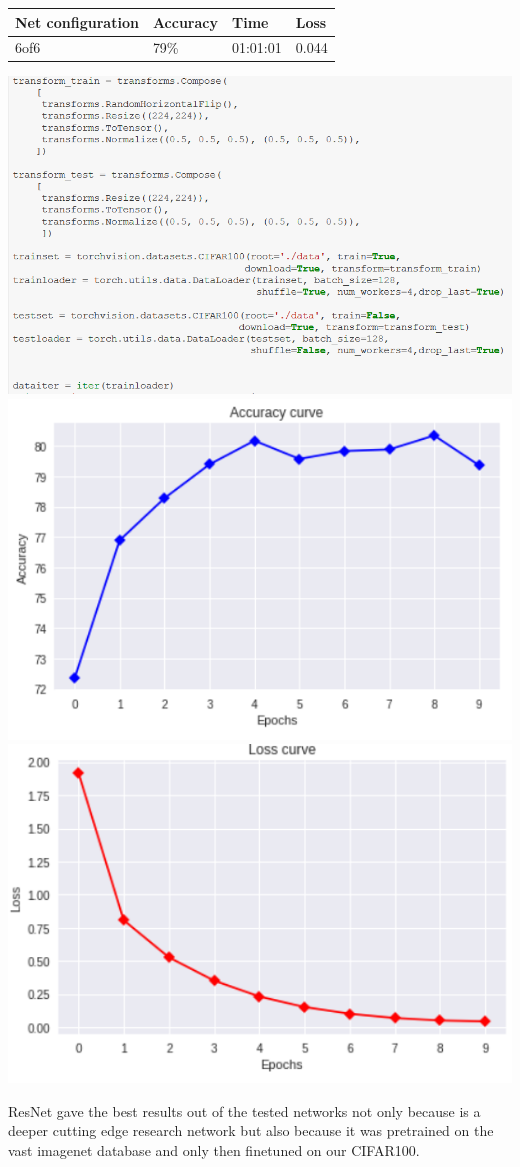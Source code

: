 \documentclass[11pt]{article}
\makeatletter
\def\maxwidth{\ifdim\Gin@nat@width>\linewidth\linewidth
  \else\Gin@nat@width\fi}
\let\Oldincludegraphics\includegraphics
\renewcommand{\includegraphics}[1]{\Oldincludegraphics[width=.8\maxwidth]{#1}}
\makeatother
\begin{document}
\begin{center}
    \begin{tabular}{ | l | l | l | l |}
    \hline
    Net configuration & Accuracy & Time & Loss \\ \hline
    6of6 & 79\% & 01:01:01 & 0.044 \\ \hline
  \end{tabular}
  \newline
  \includegraphics{3_tran.png}
  \includegraphics{3_acc.png}
  \includegraphics{3_loss.png}
\end{center}
ResNet gave the best results out of the tested networks not only because is a deeper cutting edge research network but also because it was pretrained on the vast imagenet database and only then finetuned on our CIFAR100.
\end{document}
